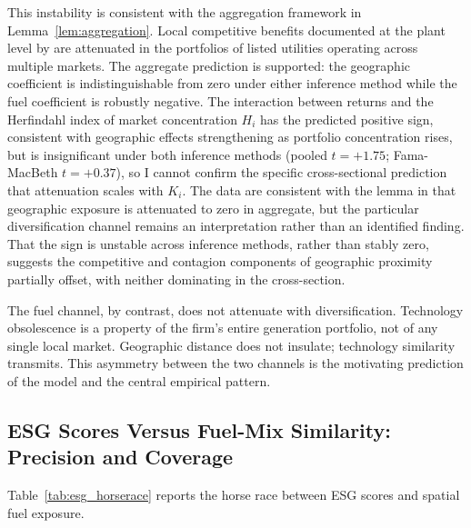 \documentclass[12pt,a4paper]{article}
\begin{document}
This instability is consistent with the aggregation framework in Lemma~\ref{lem:aggregation}. Local competitive benefits documented at the plant level by \citet{DavisHausman2016} are attenuated in the portfolios of listed utilities operating across multiple markets. The aggregate prediction is supported: the geographic coefficient is indistinguishable from zero under either inference method while the fuel coefficient is robustly negative. The interaction between returns and the Herfindahl index of market concentration $H_i$ has the predicted positive sign, consistent with geographic effects strengthening as portfolio concentration rises, but is insignificant under both inference methods (pooled $t = +1.75$; Fama-MacBeth $t = +0.37$), so I cannot confirm the specific cross-sectional prediction that attenuation scales with $K_i$. The data are consistent with the lemma in that geographic exposure is attenuated to zero in aggregate, but the particular diversification channel remains an interpretation rather than an identified finding. That the sign is unstable across inference methods, rather than stably zero, suggests the competitive and contagion components of geographic proximity \citep{LangStulz1992} partially offset, with neither dominating in the cross-section.

The fuel channel, by contrast, does not attenuate with diversification. Technology obsolescence is a property of the firm's entire generation portfolio, not of any single local market. Geographic distance does not insulate; technology similarity transmits. This asymmetry between the two channels is the motivating prediction of the model and the central empirical pattern.


\subsection{ESG Scores Versus Fuel-Mix Similarity: Precision and Coverage}\label{sec:esg}

Table~\ref{tab:esg_horserace} reports the horse race between ESG scores and spatial fuel exposure.
\end{document}
